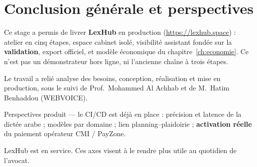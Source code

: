 \chapter{Conclusion générale et perspectives}
\label{ch:conclusion}

Ce stage a permis de livrer \textbf{LexHub} en production (\url{https://lexhub.space}) : atelier en cinq étapes, espace cabinet isolé, visibilité assistant fondée sur la \textbf{validation}, export officiel, et modèle économique du chapitre~\ref{ch:economie}. Ce n'est pas un démonstrateur hors ligne, ni l'ancienne chaîne à trois étapes.

Le travail a relié analyse des besoins, conception, réalisation et mise en production, sous le suivi de Prof.~Mohammed Al Achhab et de M.~Hatim Benhaddou (WEBVOICE).

Perspectives produit --- le CI/CD est déjà en place : précision et latence de la dictée arabe ; modèles par domaine ; lien planning--plaidoirie ; \textbf{activation réelle} du paiement opérateur CMI / PayZone.

LexHub est en service. Ces axes visent à le rendre plus utile au quotidien de l'avocat.
